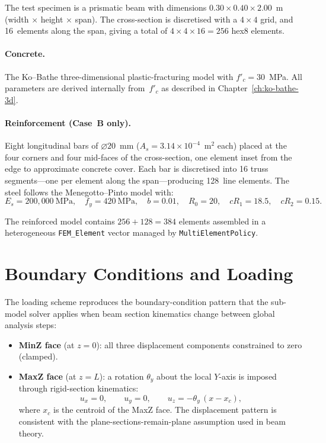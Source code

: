 The test specimen is a prismatic beam with dimensions
$0.30 \times 0.40 \times 2.00$~m (width $\times$ height $\times$ span).
The cross-section is discretised with a $4\times4$ grid, and 16~elements
along the span, giving a total of $4\times4\times16 = 256$ hex8 elements.

\paragraph{Concrete.}
The Ko--Bathe three-dimensional plastic-fracturing model with
$f'_c = 30$~MPa.  All parameters are derived internally from~$f'_c$
as described in Chapter~\ref{ch:ko-bathe-3d}.

\paragraph{Reinforcement (Case~B only).}
Eight longitudinal bars of $\varnothing 20$~mm ($A_s = 3.14\times10^{-4}$~m$^2$
each) placed at the four corners and four mid-faces of the cross-section,
one element inset from the edge to approximate concrete cover.
Each bar is discretised into 16 truss segments---one per element along
the span---producing 128~line elements. The steel follows the
Menegotto--Pinto model with:
%
\[
  E_s = 200{,}000~\text{MPa}, \quad
  f_y = 420~\text{MPa}, \quad
  b   = 0.01, \quad
  R_0 = 20, \quad
  cR_1 = 18.5, \quad
  cR_2 = 0.15.
\]

The reinforced model contains $256 + 128 = 384$ elements assembled
in a heterogeneous \texttt{FEM\_Element} vector managed by
\texttt{MultiElementPolicy}.


\section{Boundary Conditions and Loading}
\label{sec:rcbeam-loading}

The loading scheme reproduces the boundary-condition pattern that the
sub-model solver applies when beam section kinematics change between
global analysis steps:

\begin{itemize}
  \item \textbf{MinZ face} (at $z = 0$): all three displacement components
        constrained to zero (clamped).
  \item \textbf{MaxZ face} (at $z = L$): a rotation $\theta_y$ about the
        local $Y$-axis is imposed through rigid-section kinematics:
        \begin{equation}\label{eq:rcbeam-bc}
          u_x = 0, \qquad
          u_y = 0, \qquad
          u_z = -\theta_y \, (x - x_c),
        \end{equation}
        where $x_c$ is the centroid of the MaxZ face.  The displacement
        pattern is consistent with the plane-sections-remain-plane
        assumption used in beam theory.
\end{itemize}

